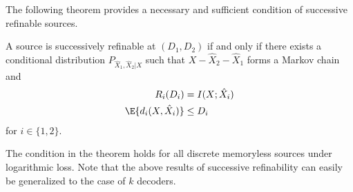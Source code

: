 \documentclass[draftclsnofoot, onecolumn, letterpaper, romanappendices]{IEEEtran}
\begin{document}
The following theorem provides a necessary and sufficient condition of successive refinable sources.
\begin{theorem}\label{thm:iffcondition for successive refinability}
    A source is successively refinable at $(D_1,D_2)$ if and only if there exists
    a conditional distribution $P_{\hat{X}_1,\hat{X}_2|X}$ such that $X-\hat{X}_2-\hat{X}_1$ forms a Markov chain and
    \begin{align*}
        R_i(D_i) &= I(X;\hat{X}_i) \\
        \E{d_i(X,\hat{X}_i)}&\leq D_i
    \end{align*}
    for $i\in\{1, 2\}$.
\end{theorem}

The condition in the theorem holds for all discrete memoryless sources under logarithmic loss.
Note that the above results of successive refinability can easily be generalized to the case of $k$ decoders.
\end{document}
